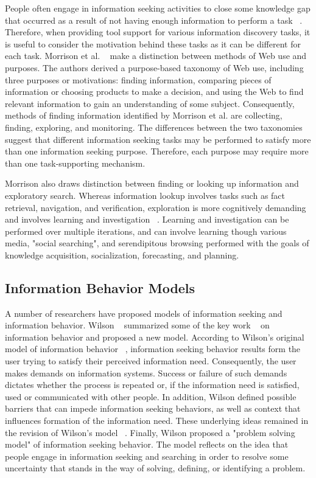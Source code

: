 \documentclass{casconpaper}
\begin{document}
{{People often engage in information seeking activities to close some knowledge gap that occurred as a result of not having enough information to perform a task ~\cite{proper}. Therefore, when providing tool support for various information discovery tasks, it is useful to consider the motivation behind these tasks as it can be different for each task. Morrison et al. ~\cite{morrison} make a distinction between methods of Web use and purposes. The authors derived a purpose-based taxonomy of Web use, including three purposes or motivations: finding information, comparing pieces of information or choosing products to make a decision, and using the Web to find relevant information to gain an understanding of some subject. Consequently, methods of finding information identified by Morrison et al. are collecting, finding, exploring, and monitoring. The differences between the two taxonomies suggest that different information seeking tasks may be performed to satisfy more than one information seeking purpose. Therefore, each purpose may require more than one task-supporting mechanism. 

Morrison also draws distinction between finding or looking up information and exploratory search. Whereas information lookup involves tasks such as fact retrieval, navigation, and verification, exploration is more cognitively demanding and involves learning and investigation ~\cite{marchionini}. Learning and investigation can be performed over multiple iterations, and can involve learning though various media, "social searching", and serendipitous browsing performed with the goals of knowledge acquisition, socialization, forecasting, and planning.  

} %

{\subsection{Information Behavior Models}

A number of researchers have proposed models of information seeking and information behavior. Wilson ~\cite{wilson1999} summarized some of the key work ~\cite{ellis1989, dervin, kuhlthau, wilson1997, wilson1981} on information behavior and proposed a new model. According to Wilson's original model of information behavior ~\cite{wilson1981}, information seeking behavior results form the user trying to satisfy their perceived information need. Consequently, the user makes demands on information systems. Success or failure of such demands dictates whether the process is repeated or, if the information need is satisfied, used or communicated with other people. In addition, Wilson defined possible barriers that can impede information seeking behaviors, as well as context that influences formation of the information need. These underlying ideas remained in the revision of Wilson's model ~\cite{wilson1997}. Finally, Wilson proposed a "problem solving model" of information seeking behavior. The model reflects on the idea that people engage in information seeking and searching in order to resolve some uncertainty that stands in the way of solving, defining, or identifying a problem.    

}}
\end{document}
